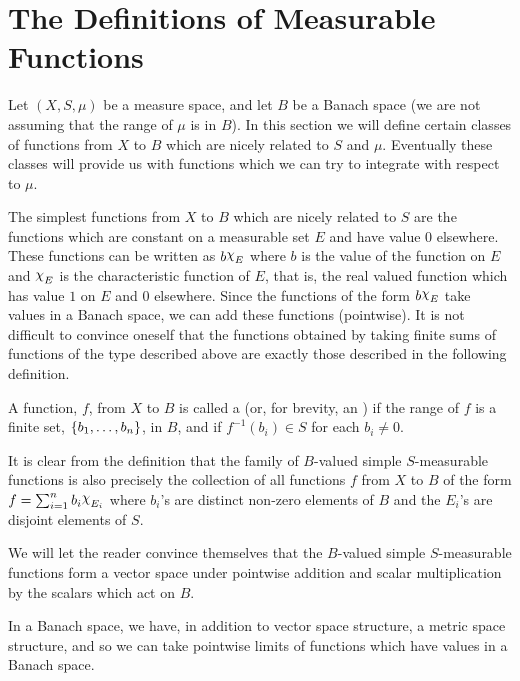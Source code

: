 
\section{The Definitions of Measurable Functions}

Let $(X,S,\mu)$ be a measure space, and let $B$ be a Banach space (we are not assuming that the range of $\mu$ is in $B$). In this section we will define certain classes of functions from $X$ to $B$ which are nicely related to $S$ and $\mu$. Eventually these classes will provide us with functions which we can try to integrate with respect to $\mu$.

The simplest functions from $X$ to $B$ which are nicely related to $S$ are the functions which are constant on a measurable set $E$ and have value 0 elsewhere. These functions can be written as $b\idf{E}$ where $b$ is the value of the function on $E$ and $\idf{E}$ is the characteristic function of $E$, that is, the real valued function which has value $1$ on $E$ and 0 elsewhere. Since the functions of the form $b\idf{E}$ take values in a Banach space, we can add these functions (pointwise). It is not difficult to convince oneself that the functions obtained by taking finite sums of functions of the type described above are exactly those described in the following definition.

\begin{definition}
A function, $f$, from $X$ to $B$ is called a  (or, for brevity, an ) if the range of $f$ is a finite set, $\left\{b_1,\dots,b_n\right\}$, in $B$, and if $f^{-1}(b_i)\in S$ for each $b_i\neq0$.
\end{definition}

It is clear from the definition that the family of $B$-valued simple $S$-measurable functions is also precisely the collection of all functions $f$ from $X$ to $B$ of the form $f=\sum_{i=1}^nb_i\idf{E_i}$ where $b_i$'s are distinct non-zero elements of $B$ and the $E_i$'s are disjoint elements of $S$.

We will let the reader convince themselves that the $B$-valued simple $S$-measurable functions form a vector space under pointwise addition and scalar multiplication by the scalars which act on $B$.

In a Banach space, we have, in addition to vector space structure, a metric space structure, and so we can take pointwise limits of functions which have values in a Banach space.

